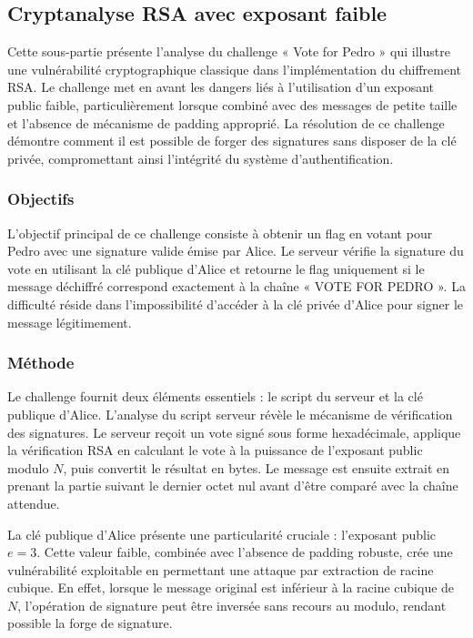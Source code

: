     \subsection{Cryptanalyse RSA avec exposant faible}
    Cette sous-partie présente l'analyse du challenge « Vote for Pedro » qui illustre une vulnérabilité cryptographique classique dans l'implémentation du chiffrement RSA. Le challenge met en avant les dangers liés à l'utilisation d'un exposant public faible, particulièrement lorsque combiné avec des messages de petite taille et l'absence de mécanisme de padding approprié. La résolution de ce challenge démontre comment il est possible de forger des signatures sans disposer de la clé privée, compromettant ainsi l'intégrité du système d'authentification.
    
    \subsubsection{Objectifs}
    L'objectif principal de ce challenge consiste à obtenir un flag en votant pour Pedro avec une signature valide émise par Alice. Le serveur vérifie la signature du vote en utilisant la clé publique d'Alice et retourne le flag uniquement si le message déchiffré correspond exactement à la chaîne « VOTE FOR PEDRO ». La difficulté réside dans l'impossibilité d'accéder à la clé privée d'Alice pour signer le message légitimement.
    
    \subsubsection{Méthode}
    Le challenge fournit deux éléments essentiels : le script du serveur et la clé publique d'Alice. L'analyse du script serveur révèle le mécanisme de vérification des signatures. Le serveur reçoit un vote signé sous forme hexadécimale, applique la vérification RSA en calculant le vote à la puissance de l'exposant public modulo $N$, puis convertit le résultat en bytes. Le message est ensuite extrait en prenant la partie suivant le dernier octet nul avant d'être comparé avec la chaîne attendue.

    La clé publique d'Alice présente une particularité cruciale : l'exposant public $e = 3$. Cette valeur faible, combinée avec l'absence de padding robuste, crée une vulnérabilité exploitable en permettant une attaque par extraction de racine cubique. En effet, lorsque le message original est inférieur à la racine cubique de $N$, l'opération de signature peut être inversée sans recours au modulo, rendant possible la forge de signature.
    
